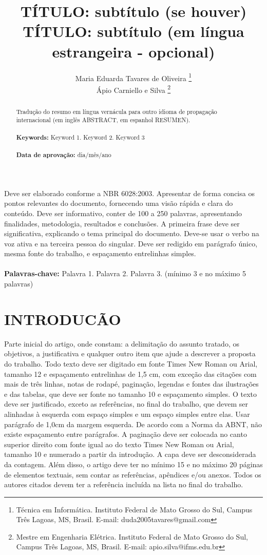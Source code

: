 \documentclass[12pt]{article}
\title{TÍTULO: subtítulo (se houver)\\ TÍTULO: subtítulo (em língua estrangeira - opcional)}
\author{ Maria Eduarda Tavares de Oliveira \thanks{Técnica em Informática. Instituto Federal de Mato Grosso do Sul, Campus Três Lagoas, MS, Brasil. E-mail: duda2005tavares@gmail.com}  \\ {Ápio Carniello e Silva \thanks{Mestre em Engenharia Elétrica. Instituto Federal de Mato Grosso do Sul, Campus Três Lagoas, MS, Brasil. E-mail: apio.silva@ifms.edu.br}}}
\begin{document}
 

\maketitle

\begin {resumo} %
  Deve ser elaborado conforme a NBR 6028:2003. Apresentar de forma concisa os pontos relevantes do documento, fornecendo uma visão rápida e clara do conteúdo. Deve ser informativo, conter de 100 a 250 palavras, apresentando finalidades, metodologia, resultados e conclusões. A primeira frase deve ser significativa, explicando o tema principal do documento. Deve-se usar o verbo na voz ativa e na terceira pessoa do singular. Deve ser redigido em parágrafo único, mesma fonte do trabalho, e espaçamento entrelinhas simples. \\ \\ \textbf{Palavras-chave:} Palavra 1. Palavra 2. Palavra 3. (mínimo 3 e no máximo 5 palavras)
\end{resumo} 

\begin{abstract}
  Tradução do resumo em língua vernácula para outro idioma de propagação internacional (em inglês ABSTRACT, em espanhol RESUMEN).\\ \\ \textbf{Keywords:} Keyword 1. Keyword 2. Keyword 3 \\ \\ \textbf{Data de aprovação:} dia/mês/ano
\end{abstract}

\onehalfspacing

\section{INTRODUCÃO} 

Parte inicial do artigo, onde constam: a delimitação do assunto tratado, os objetivos, a justificativa e qualquer outro item que ajude a descrever a proposta do trabalho. 
Todo texto deve ser digitado em fonte Times New Roman ou Arial, tamanho 12 e espaçamento entrelinhas de 1,5 cm, com exceção das citações com mais de três linhas, notas de rodapé, paginação, legendas e fontes das ilustrações e das tabelas, que deve ser fonte no tamanho 10 e espaçamento simples. 
O texto deve ser justificado, exceto as referências, no final do trabalho, que devem ser alinhadas à esquerda com espaço simples e um espaço simples entre elas. 
Usar parágrafo de 1,0cm da margem esquerda. De acordo com a Norma da ABNT, não existe espaçamento entre parágrafos.
A paginação deve ser colocada no canto superior direito com fonte igual ao do texto Times New Roman ou Arial, tamanho 10 e numerado a partir da introdução. A capa deve ser desconsiderada da contagem. Além disso, o artigo deve ter no mínimo 15 e no máximo 20 páginas de elementos textuais, sem contar as referências, apêndices e/ou anexos.
Todos os autores citados devem ter a referência incluída na lista no final do trabalho.
\end{document}
